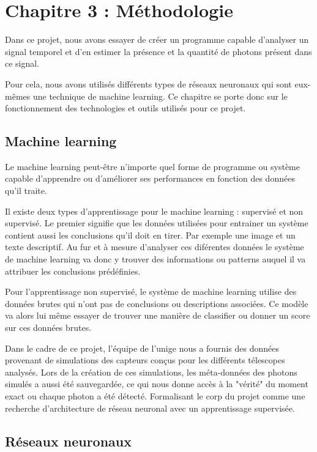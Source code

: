 \chapter{Chapitre 3 : Méthodologie}

Dans ce projet, nous avons essayer de créer un programme capable d'analyser un signal temporel et 
d'en estimer la présence et la quantité de photons présent dans ce signal.

Pour cela, nous avons utilisés différents types de réseaux neuronaux qui sont eux-mêmes une technique de machine learning.
Ce chapitre se porte donc sur le fonctionnement des technologies et outils utilisés pour ce projet. 

\section{Machine learning}

Le machine learning peut-être n'importe quel forme de programme ou système capable d'apprendre ou d'améliorer ses performances
en fonction des données qu'il traite.

Il existe deux types d'apprentissage pour le machine learning : supervisé et non supervisé.
Le premier signifie que les données utilisées pour entrainer un système contient aussi les conclusions qu'il doit en tirer.
Par exemple une image et un texte descriptif. Au fur et à mesure d'analyser ces diférentes données le système de machine learning
va donc y trouver des informations ou patterns auquel il va attribuer les conclusions prédéfinies.

Pour l'apprentissage non supervisé, le système de machine learning utilise des données brutes qui n'ont pas de conclusions ou descriptions associées.
Ce modèle va alors lui même essayer de trouver une manière de classifier ou donner un score sur ces données brutes.

Dans le cadre de ce projet, l'équipe de l'\gls{unige} nous a fournis des données provenant de simulations des capteurs conçus pour les différents télescopes analysés.
Lors de la création de ces simulations, les méta-données des photons simulés a aussi été sauvegardée, ce qui nous donne accès
à la "vérité" du moment exact ou chaque photon a été détecté. 
Formalisant le corp du projet comme une recherche d'architecture de réseau neuronal avec un apprentissage supervisée.

\section{Réseaux neuronaux}

